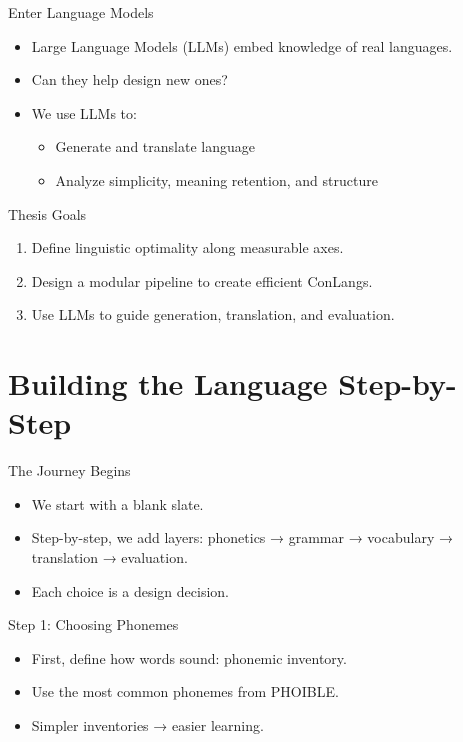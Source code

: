 \documentclass{beamer}
\begin{document}
\begin{frame}{Enter Language Models}
	\begin{itemize}
		\item Large Language Models (LLMs) embed knowledge of real languages.
		\item Can they help design new ones?
		\item We use LLMs to:
		\begin{itemize}
			\item Generate and translate language
			\item Analyze simplicity, meaning retention, and structure
		\end{itemize}
	\end{itemize}
\end{frame}

\begin{frame}{Thesis Goals}
	\begin{enumerate}
		\item Define linguistic optimality along measurable axes.
		\item Design a modular pipeline to create efficient ConLangs.
		\item Use LLMs to guide generation, translation, and evaluation.
	\end{enumerate}
\end{frame}

\section{Building the Language Step-by-Step}

\begin{frame}{The Journey Begins}
	\begin{itemize}
		\item We start with a blank slate.
		\item Step-by-step, we add layers: phonetics → grammar → vocabulary → translation → evaluation.
		\item Each choice is a design decision.
	\end{itemize}
\end{frame}

\begin{frame}{Step 1: Choosing Phonemes}
	\begin{itemize}
		\item First, define how words sound: phonemic inventory.
		\item Use the most common phonemes from PHOIBLE.
		\item Simpler inventories → easier learning.
	\end{itemize}
\end{frame}
\end{document}

